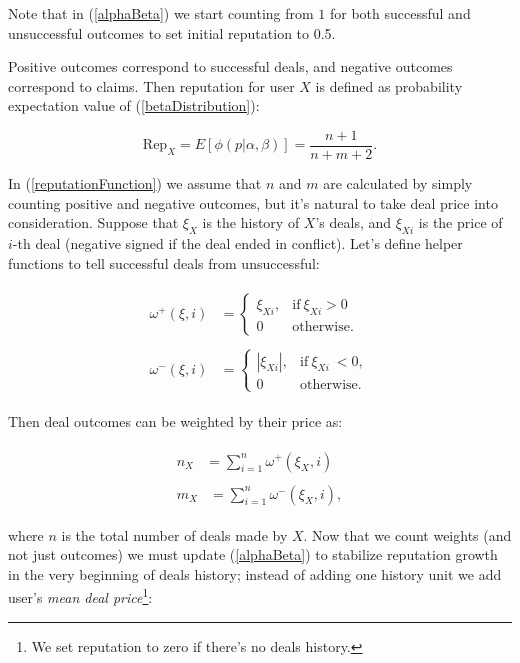 \documentclass[11pt]{article}
\begin{document}
Note that in (\ref{alphaBeta}) we start counting from $ 1 $ for both successful and unsuccessful outcomes to set initial reputation to 0.5.

Positive outcomes correspond to successful deals, and negative outcomes correspond to claims. Then  reputation for user $ X $ is defined as probability expectation value of (\ref{betaDistribution}):

\begin{equation} \label{reputationFunction}
\text{Rep}_{X} = E[\phi(p | \alpha, \beta)] = \frac{n + 1}{n + m + 2}.
\end{equation}

In (\ref{reputationFunction}) we assume that $ n $ and $ m $ are calculated by simply counting positive and negative outcomes, but it's natural to take deal price into consideration. Suppose that $ \xi_{X} $ is the history of $ X $'s deals, and $ \xi_{Xi} $ is the price of $ i $-th deal (negative signed if the deal ended in conflict). Let's define helper functions to tell successful deals from unsuccessful:

\begin{align}
\begin{split}
\omega^{+}(\xi, i) {}& = \begin{cases} \xi_{Xi}, & \text{if}\ \xi_{Xi} > 0\, \\ 0 & \mbox{otherwise.} \end{cases}
\end{split} \\
\begin{split}
\omega^{-}(\xi, i) {}& = \begin{cases} |\xi_{Xi}|, & \text{if}\ \xi_{Xi}\ < 0, \\ 0 & \mbox{otherwise.} \end{cases}
\end{split}
\end{align}

Then deal outcomes can be weighted by their price as:

\begin{align}
\begin{split}
n_{X} {} & = \sum_{i = 1}^{n} \omega^{+}(\xi_X, i)
\end{split} \\
\begin{split}
m_{X} {}& = \sum_{i = 1}^{n} \omega^{-}(\xi_X, i), 
\end{split}
\end{align}

where $ n $ is the total number of deals made by $ X $. Now that we count weights (and not just outcomes) we must update (\ref{alphaBeta}) to stabilize reputation growth in the very beginning of deals history; instead of adding one history unit we add user's \textit{mean deal price}\footnote{We set reputation to zero if there's no deals history.}:
\end{document}
